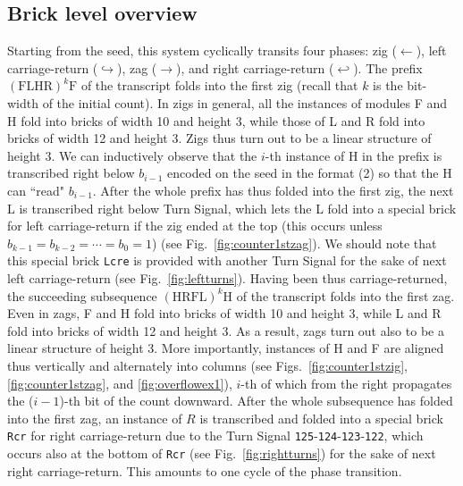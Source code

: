 \documentclass[twocolumn]{svjour3}
\begin{document}
\subsection{Brick level overview}
Starting from the seed, this system cyclically transits four phases: zig ($\leftarrow$), left carriage-return ($\hookrightarrow$), zag ($\rightarrow$), and right carriage-return ($\hookleftarrow$). 
The prefix $(\mathrm{FLHR})^k \mathrm{F}$ of the transcript folds into the first zig (recall that $k$ is the bit-width of the initial count). 
In zigs in general, all the instances of modules F and H fold into bricks of width 10 and height 3, while those of L and R fold into bricks of width 12 and height 3. 
Zigs thus turn out to be a linear structure of height 3. 
We can inductively observe that the $i$-th instance of H in the prefix is transcribed right below $b_{i-1}$ encoded on the seed in the format (2) so that the H can ``read" $b_{i-1}$. 
After the whole prefix has thus folded into the first zig, the next L is transcribed right below Turn Signal, which lets the L fold into a special brick for left carriage-return if the zig ended at the top (this occurs unless $b_{k-1} = b_{k-2} = \cdots = b_0 = 1$) (see Fig.~\ref{fig:counter1stzag}). 
We should note that this special brick \texttt{Lcre} is provided with another Turn Signal for the sake of next left carriage-return (see Fig.~\ref{fig:leftturns}).
Having been thus carriage-returned, the succeeding subsequence $(\mathrm{HRFL})^k \mathrm{H}$ of the transcript folds into the first zag.
Even in zags, F and H fold into bricks of width 10 and height 3, while L and R fold into bricks of width 12 and height 3. 
As a result, zags turn out also to be a linear structure of height 3. 
More importantly, instances of H and F are aligned thus vertically and alternately into columns (see Figs.~\ref{fig:counter1stzig}, \ref{fig:counter1stzag}, and \ref{fig:overflowex1}), $i$-th of which from the right propagates the ($i{-}1$)-th bit of the count downward. 
After the whole subsequence has folded into the first zag, an instance of $R$ is transcribed and folded into a special brick \texttt{Rcr} for right carriage-return due to the Turn Signal \texttt{125}-\texttt{124}-\texttt{123}-\texttt{122}, which occurs also at the bottom of \texttt{Rcr} (see Fig.~\ref{fig:rightturns}) for the sake of next right carriage-return. 
This amounts to one cycle of the phase transition.
 
\end{document}
